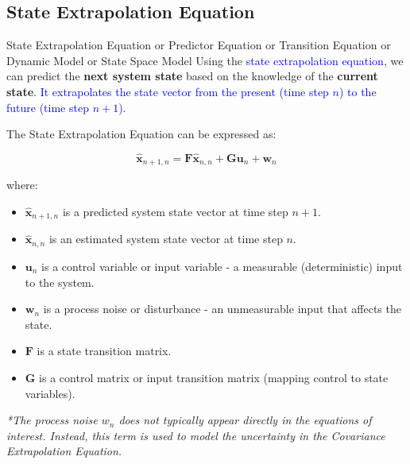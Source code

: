 \subsection{State Extrapolation Equation}
\begin{frame}{State Extrapolation Equation or Predictor Equation or Transition Equation or Dynamic Model or State Space Model}
Using the \textcolor{blue}{state extrapolation equation}, we can predict the \textbf{next system state} based
on the knowledge of the \textbf{current state}. \textcolor{blue}{It extrapolates the state vector from the
present (time step $n$) to the future (time step $n + 1$).}   

The State Extrapolation Equation can be expressed as:
\begin{minipage}{1\linewidth} %
\begin{exampleblock}{}{
\begin{equation}
\mathbf{\hat{x}}_{n+1,n} = \mathbf{F} \mathbf{\hat{x}}_{n,n} + \mathbf{G} \mathbf{u}_{n} + \mathbf{w}_{n}\tag{1}
\end{equation}

where:
\begin{itemize}
    \item $\mathbf{\hat{x}}_{n+1,n}$ is a predicted system state vector at time step $n + 1$.
    \item $\mathbf{\hat{x}}_{n,n}$ is an estimated system state vector at time step $n$.
    \item $\mathbf{u}_{n}$ is a control variable or input variable - a measurable (deterministic) input to the system.
    \item $\mathbf{w}_{n}$ is a process noise or disturbance - an unmeasurable input that affects the state.
    \item $\mathbf{F}$ is a state transition matrix.
    \item $\mathbf{G}$ is a control matrix or input transition matrix (mapping control to state variables).
\end{itemize}}
\end{exampleblock}
\end{minipage}

\textit{*The process noise $w_n$ does not typically appear directly in the equations of
interest. Instead, this term is used to model the uncertainty in the Covariance
Extrapolation Equation.}
\end{frame}

